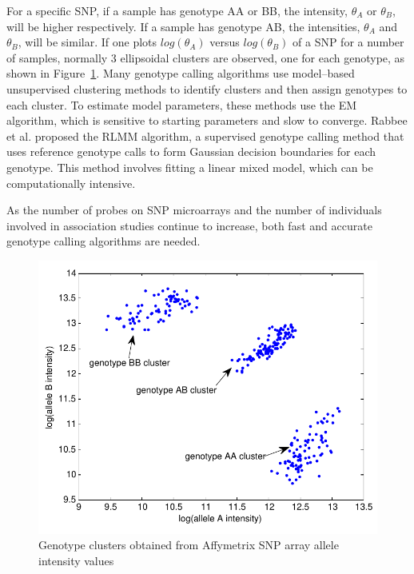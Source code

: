 \documentclass{scrartcl}
\begin{document}
\par
For a specific SNP, if a sample has genotype AA or BB, the intensity,
$\theta_A$ or $\theta_B$, will be higher respectively. 
If a sample has genotype AB, the intensities, $\theta_A$ and $\theta_B$,
will be similar.
If one plots $log(\theta_A)$ versus $log(\theta_B)$ of a SNP for a number of
samples, normally 3 ellipsoidal clusters are observed, one for each genotype,
as shown in Figure~\ref{fig:intro_genclus}.
Many genotype calling algorithms use model--based unsupervised clustering
methods to identify clusters and then assign genotypes to each cluster.
To estimate model parameters, these methods use the EM algorithm, which is
sensitive to starting parameters and slow to converge.
Rabbee et al. proposed the RLMM algorithm, a supervised genotype calling
method that uses reference genotype calls to form Gaussian decision
boundaries for each genotype.
This method involves fitting a linear mixed model, which can be computationally
intensive.

\par
As the number of probes on SNP microarrays and the number of individuals involved
in association studies continue to increase, both fast and accurate genotype
calling algorithms are needed.

\begin{figure}[H]
\centering
\includegraphics[scale=0.75]{intro_figs/intro_genotype_clusters.pdf}
\caption{Genotype clusters obtained from Affymetrix SNP array
allele intensity values}
\label{fig:intro_genclus}
\end{figure}
\end{document}

